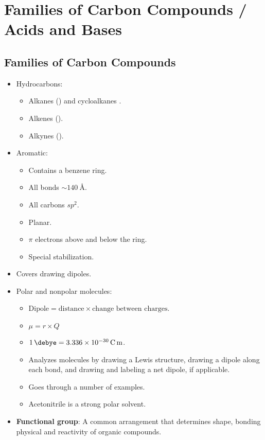 \documentclass[../notes.tex]{subfiles}
\begin{document}
\chapter{Families of Carbon Compounds / Acids and Bases}
\section{Families of Carbon Compounds}
\begin{itemize}
    \item {}Hydrocarbons:
    \begin{itemize}
        \item Alkanes () and cycloalkanes .
        \item Alkenes ().
        \item Alkynes ().
    \end{itemize}
    \item Aromatic:
    \begin{itemize}
        \item Contains a benzene ring.
        \item All bonds $\sim\SI{140}{\angstrom}$.
        \item All carbons $sp^2$.
        \item Planar.
        \item $\pi$ electrons above and below the ring.
        \item Special stabilization.
    \end{itemize}
    \item Covers drawing dipoles.
    \item Polar and nonpolar molecules:
    \begin{itemize}
        \item $\text{Dipole}=\text{distance}\times\text{change between charges}$.
        \item $\mu=r\times Q$
        \item $\SI{1}{\debye}=\SI{3.336e-30}{\coulomb\meter}$.
        \item Analyzes molecules by drawing a Lewis structure, drawing a dipole along each bond, and drawing and labeling a net dipole, if applicable.
        \item Goes through a number of examples.
        \item Acetonitrile is a strong polar solvent.
    \end{itemize}
    \item \textbf{Functional group}: A common arrangement that determines shape, bonding physical and reactivity of organic compounds.

\end{itemize}
\end{document}
